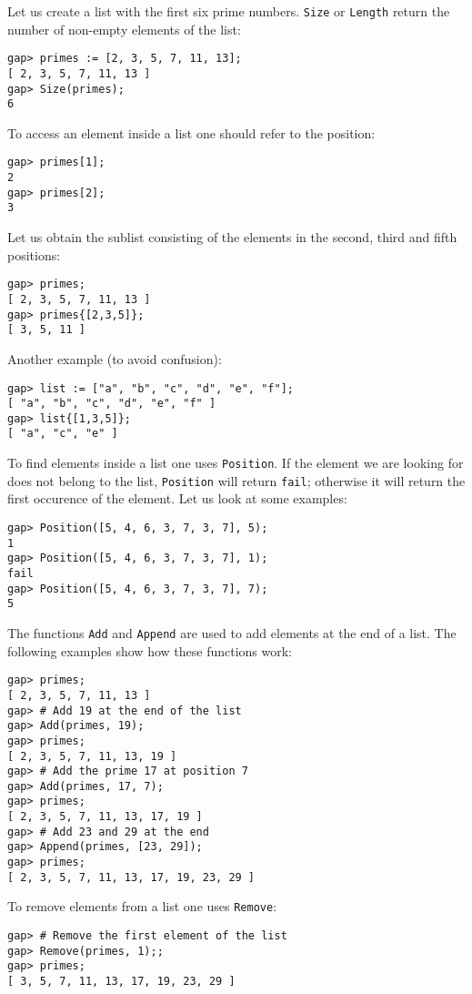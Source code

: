 \begin{example}
Let us create a list with the first six prime numbers. \lstinline{Size} or
\lstinline{Length} return the number of non-empty elements of the list:
\begin{lstlisting}
gap> primes := [2, 3, 5, 7, 11, 13];
[ 2, 3, 5, 7, 11, 13 ]
gap> Size(primes);
6
\end{lstlisting}
To access an element inside a list one should refer to the position:
\begin{lstlisting}
gap> primes[1];
2
gap> primes[2];
3
\end{lstlisting}
Let us obtain the sublist consisting of the elements in the second, third and
fifth positions:
\begin{lstlisting}
gap> primes;
[ 2, 3, 5, 7, 11, 13 ]
gap> primes{[2,3,5]};
[ 3, 5, 11 ]
\end{lstlisting}
Another example (to avoid confusion):
\begin{lstlisting}
gap> list := ["a", "b", "c", "d", "e", "f"];
[ "a", "b", "c", "d", "e", "f" ]
gap> list{[1,3,5]};
[ "a", "c", "e" ]
\end{lstlisting}
To find elements inside a list one uses \lstinline{Position}. If the element we
are looking for does not belong to the list, \lstinline{Position} will return
\lstinline{fail}; otherwise it will return the first occurence of the element. 
Let us look at some examples:
\begin{lstlisting}
gap> Position([5, 4, 6, 3, 7, 3, 7], 5);
1
gap> Position([5, 4, 6, 3, 7, 3, 7], 1);
fail
gap> Position([5, 4, 6, 3, 7, 3, 7], 7);
5
\end{lstlisting}

The functions \lstinline{Add} and \lstinline{Append} are used to add elements at the end of a
list. The following examples show how these functions  
work:
\begin{lstlisting}
gap> primes;
[ 2, 3, 5, 7, 11, 13 ]
gap> # Add 19 at the end of the list 
gap> Add(primes, 19);
gap> primes;
[ 2, 3, 5, 7, 11, 13, 19 ]
gap> # Add the prime 17 at position 7
gap> Add(primes, 17, 7); 
gap> primes;
[ 2, 3, 5, 7, 11, 13, 17, 19 ]
gap> # Add 23 and 29 at the end
gap> Append(primes, [23, 29]);
gap> primes;
[ 2, 3, 5, 7, 11, 13, 17, 19, 23, 29 ]
\end{lstlisting}
\end{example}

To remove elements from a list one uses \lstinline{Remove}:
\begin{lstlisting}
gap> # Remove the first element of the list
gap> Remove(primes, 1);;
gap> primes;
[ 3, 5, 7, 11, 13, 17, 19, 23, 29 ]
\end{lstlisting}

